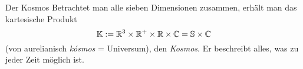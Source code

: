 \begin{bla}{Der Kosmos}
Betrachtet man alle sieben Dimensionen zusammen, erhält man das kartesische Produkt
\begin{equation}
\mathbb{K}:=\mathbb{R}^3\times\mathbb{R}^+\times\mathbb{R}\times\mathbb{C}=\mathbb{S}\times\mathbb{C}
\end{equation}
(von aurelianisch \emph{kósmos} = Universum), den \emph{Kosmos}. Er beschreibt alles, was zu jeder Zeit möglich ist.
\end{bla}